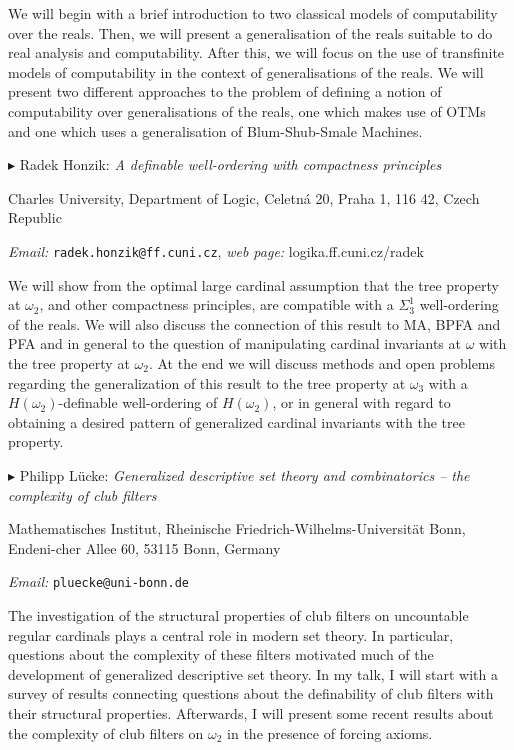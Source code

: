 \documentclass[a4paper]{amsart}
\theoremstyle{remark}
\newcommand{\vsp}{\vspace{20pt}}
\begin{document}
We will begin with a brief introduction to two classical models of computability over the reals. Then, we will present a generalisation of the reals suitable to do real analysis and computability. After this, we will focus on the use of transfinite models of computability in the context of generalisations of the reals. We will present two different approaches to the problem of defining a notion of computability over generalisations of the reals, one which makes use of OTMs and one which uses a generalisation of Blum-Shub-Smale Machines. 








\vsp 

\noindent 
$\blacktriangleright$ Radek Honzik: \emph{A definable well-ordering with compactness principles} 

\noindent 
Charles University, Department of Logic,
Celetn{\' a} 20, Praha 1, 
116 42, Czech Republic 

\noindent 
\emph{Email:} \texttt{radek.honzik@ff.cuni.cz}, \emph{web page:} logika.ff.cuni.cz/radek  

We will show from the optimal large cardinal assumption that the tree property at $\omega_2$, and other compactness principles, are compatible with a $\Sigma^1_3$ well-ordering of the reals. We will also discuss the connection of this result to MA, BPFA and PFA and in general to the question of manipulating cardinal invariants at $\omega$ with the tree property at $\omega_2$. At the end we will discuss methods and open problems regarding the generalization of this result to the tree property at $\omega_3$ with a $H(\omega_2)$-definable well-ordering of $H(\omega_2)$, or in general with regard to obtaining a desired pattern of generalized cardinal invariants with the tree property.







\vsp 

\noindent 
$\blacktriangleright$ Philipp L\"ucke: \emph{Generalized descriptive set theory and combinatorics -- the complexity of club filters} 

\noindent 
Mathematisches Institut, Rheinische Friedrich-Wilhelms-Universit\"at Bonn, Endeni-cher Allee 60, 53115 Bonn, Germany 

\noindent 
\emph{Email:} \texttt{pluecke@uni-bonn.de}

The investigation of the structural properties of club filters on uncountable regular cardinals plays a central role in modern set theory.    
In particular, questions about the complexity of these filters motivated much of the development of generalized descriptive set theory. In my talk, I will start with a survey of results connecting questions about the definability of club filters with their  structural properties. Afterwards, I will present some recent results about the complexity of club filters on $\omega_2$ in the presence of forcing axioms. 
\end{document}
